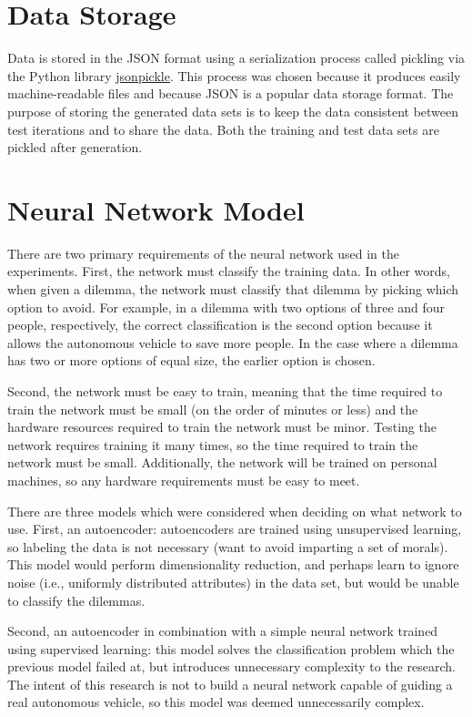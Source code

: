 \documentclass[paper=a4paper]{report}
\begin{document}
\FloatBarrier
\section{Data Storage}

Data is stored in the JSON format using a serialization process called pickling via the Python
library \href{https://jsonpickle.github.io/}{jsonpickle}. This process was chosen because it
produces easily machine-readable files and because JSON is a popular data storage format. The
purpose of storing the generated data sets is to keep the data consistent between test iterations
and to share the data. Both the training and test data sets are pickled after generation.

\FloatBarrier
\section{Neural Network Model}

There are two primary requirements of the neural network used in the experiments. First, the network
must classify the training data. In other words, when given a dilemma, the network must classify
that dilemma by picking which option to avoid. For example, in a dilemma with two options of three
and four people, respectively, the correct classification is the second option because it allows the
autonomous vehicle to save more people. In the case where a dilemma has two or more options of equal
size, the earlier option is chosen.

Second, the network must be easy to train, meaning that the time required to train the network must
be small (on the order of minutes or less) and the hardware resources required to train the network
must be minor. Testing the network requires training it many times, so the time required to train
the network must be small. Additionally, the network will be trained on personal machines, so any
hardware requirements must be easy to meet.

There are three models which were considered when deciding on what network to use. First, an
autoencoder: autoencoders are trained using unsupervised learning, so labeling the data is not
necessary (want to avoid imparting a set of morals). This model would perform dimensionality
reduction, and perhaps learn to ignore noise (i.e., uniformly distributed attributes) in the data
set, but would be unable to classify the dilemmas.

Second, an autoencoder in combination with a simple neural network trained using supervised
learning: this model solves the classification problem which the previous model failed at, but
introduces unnecessary complexity to the research. The intent of this research is not to build a
neural network capable of guiding a real autonomous vehicle, so this model was deemed unnecessarily
complex.
\end{document}
